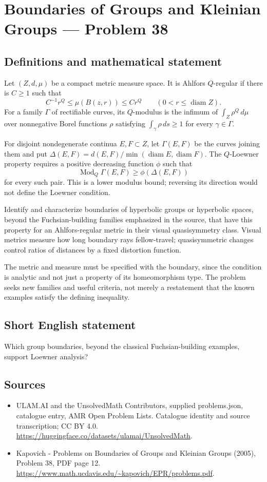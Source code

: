 \documentclass[11pt,a4paper]{article}
\begin{document}
\section*{Boundaries of Groups and Kleinian Groups — Problem 38}\label{statement}

\subsection{Definitions and mathematical statement}
Let $(Z,d,\mu)$ be a compact metric measure space. It is Ahlfors $Q$-regular if there is $C\geq1$ such that
\[
 C^{-1}r^Q\leq\mu(B(z,r))\leq Cr^Q
 \qquad(0<r\leq\operatorname{diam}Z).
\]
For a family $\Gamma$ of rectifiable curves, its $Q$-modulus is the infimum of $\int_Z\rho^Q\,d\mu$ over nonnegative Borel functions $\rho$ satisfying $\int_\gamma\rho\,ds\geq1$ for every $\gamma\in\Gamma$.

For disjoint nondegenerate continua $E,F\subset Z$, let $\Gamma(E,F)$ be the curves joining them and put $\Delta(E,F)=d(E,F)/\min(\operatorname{diam}E,\operatorname{diam}F)$. The $Q$-Loewner property requires a positive decreasing function $\phi$ such that
\[
 \operatorname{Mod}_Q\Gamma(E,F)\geq\phi(\Delta(E,F))
\]
for every such pair. This is a lower modulus bound; reversing its direction would not define the Loewner condition.

Identify and characterize boundaries of hyperbolic groups or hyperbolic spaces, beyond the Fuchsian-building families emphasized in the source, that have this property for an Ahlfors-regular metric in their visual quasisymmetry class. Visual metrics measure how long boundary rays fellow-travel; quasisymmetric changes control ratios of distances by a fixed distortion function.

The metric and measure must be specified with the boundary, since the condition is analytic and not just a property of its homeomorphism type. The problem seeks new families and useful criteria, not merely a restatement that the known examples satisfy the defining inequality.
\subsection{Short English statement}
Which group boundaries, beyond the classical Fuchsian-building examples, support Loewner analysis?
\subsection{Sources}
\begin{itemize}
\item[S1] ULAM.AI and the UnsolvedMath Contributors, supplied problems.json, catalogue entry, AMR Open Problem Lists. Catalogue identity and source transcription; CC BY 4.0.
\url{https://huggingface.co/datasets/ulamai/UnsolvedMath}.
\item[S2] Kapovich - Problems on Boundaries of Groups and Kleinian Groups (2005), Problem 38, PDF page 12. 
\url{https://www.math.ucdavis.edu/~kapovich/EPR/problems.pdf}.
\end{itemize}
\end{document}
